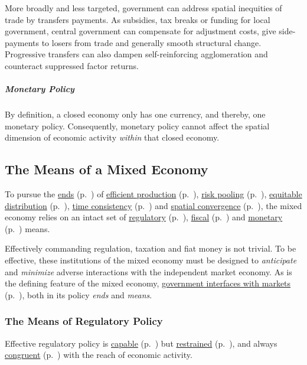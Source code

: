 More broadly and less targeted, government can address spatial inequities of trade by transfers payments. As subsidies, tax breaks or funding for local government, central government can compensate for adjustment costs, give side-payments to losers from trade and generally smooth structural change. Progressive transfers can also dampen self-reinforcing agglomeration and counteract suppressed factor returns.

\subparagraph{Monetary Policy}
By definition, a closed economy only has one currency, and thereby, one monetary policy. Consequently, monetary policy cannot affect the spatial dimension of economic activity \emph{within} that closed economy.

\subsection[Means]{The Means of a Mixed Economy} \label{sec:means}
To pursue the \hyperref[sec:ends]{ends} (p.~\pageref{sec:ends}) of \hyperref[sec:production]{efficient production} (p.~\pageref{sec:production}), \hyperref[sec:risk]{risk pooling} (p.~\pageref{sec:risk}), \hyperref[sec:distribution]{equitable distribution} (p.~\pageref{sec:distribution}), \hyperref[sec:time]{time consistency} (p.~\pageref{sec:time}) and \hyperref[sec:space]{spatial convergence} (p.~\pageref{sec:space}), the mixed economy relies on an intact set of \hyperref[sec:regulatory]{regulatory} (p.~\pageref{sec:regulatory}), \hyperref[sec:fiscal]{fiscal} (p.~\pageref{sec:fiscal}) and \hyperref[sec:monetary]{monetary} (p.~\pageref{sec:monetary}) means.

Effectively commanding regulation, taxation and fiat money is not trivial. To be effective, these institutions of the mixed economy must be designed to \emph{anticipate} and \emph{minimize} adverse interactions with the independent market economy. As is the defining feature of the mixed economy, \hyperref[sec:interface]{government interfaces with markets} (p.~\pageref{sec:interface}), both in its policy \emph{ends} and \emph{means}.

\subsubsection[Regulatory Policy]{The Means of Regulatory Policy} \label{sec:regulatory}

Effective regulatory policy is \hyperref[it:capability]{capable} (p.~\pageref{it:capability}) but \hyperref[it:restraint]{restrained} (p.~\pageref{it:restraint}), and always \hyperref[it:congruence]{congruent} (p.~\pageref{it:congruence}) with the reach of economic activity.

